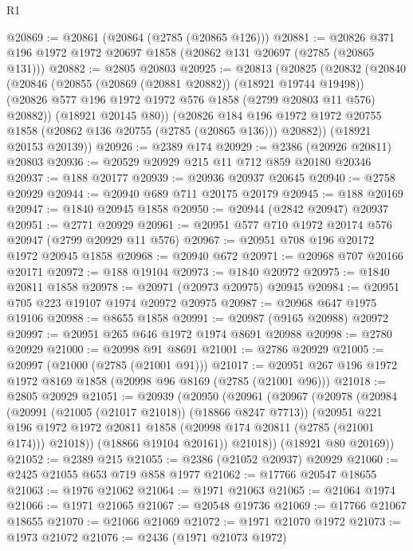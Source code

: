\begin{lexlean}{R1}
\begin{coremodule}
@20869 := @20861 (@20864 (@2785 (@20865 @126)))
@20881 := @20826 @371 @196 @1972 @1972 @20697 @1858 (@20862 @131 @20697 (@2785 (@20865 @131)))
@20882 := @2805 @20803
@20925 := @20813
    (@20825
      (@20832
        (@20840
          (@20846
            (@20855 (@20869 (@20881 @20882)) (@18921 @19744 @19498))
            (@20826 @577 @196 @1972 @1972 @576 @1858 (@2799 @20803 @11 @576) @20882))
          (@18921 @20145 @80))
        (@20826
          @184
          @196
          @1972
          @1972
          @20755
          @1858
          (@20862 @136 @20755 (@2785 (@20865 @136)))
          @20882))
      (@18921 @20153 @20139))
@20926 := @2389 @174
@20929 := @2386 (@20926 @20811) @20803
@20936 := @20529 @20929 @215 @11 @712 @859 @20180 @20346
@20937 := @188 @20177
@20939 := @20936 @20937 @20645
@20940 := @2758 @20929
@20944 := @20940 @689 @711 @20175 @20179
@20945 := @188 @20169
@20947 := @1840 @20945 @1858
@20950 := @20944 (@2842 @20947) @20937
@20951 := @2771 @20929
@20961 := @20951 @577 @710 @1972 @20174 @576 @20947 (@2799 @20929 @11 @576)
@20967 := @20951 @708 @196 @20172 @1972 @20945 @1858
@20968 := @20940 @672
@20971 := @20968 @707 @20166 @20171
@20972 := @188 @19104
@20973 := @1840 @20972
@20975 := @1840 @20811 @1858
@20978 := @20971 (@20973 @20975) @20945
@20984 := @20951 @705 @223 @19107 @1974 @20972 @20975
@20987 := @20968 @647 @1975 @19106
@20988 := @8655 @1858
@20991 := @20987 (@9165 @20988) @20972
@20997 := @20951 @265 @646 @1972 @1974 @8691 @20988
@20998 := @2780 @20929
@21000 := @20998 @91 @8691
@21001 := @2786 @20929
@21005 := @20997 (@21000 (@2785 (@21001 @91)))
@21017 := @20951 @267 @196 @1972 @1972 @8169 @1858 (@20998 @96 @8169 (@2785 (@21001 @96)))
@21018 := @2805 @20929
@21051 := @20939
    (@20950
      (@20961
        (@20967
          (@20978
            (@20984
              (@20991 (@21005 (@21017 @21018)) (@18866 @8247 @7713))
              (@20951
                @221
                @196
                @1972
                @1972
                @20811
                @1858
                (@20998 @174 @20811 (@2785 (@21001 @174)))
                @21018))
            (@18866 @19104 @20161))
          @21018))
      (@18921 @80 @20169))
@21052 := @2389 @215
@21055 := @2386 (@21052 @20937) @20929
@21060 := @2425 @21055 @653 @719 @858 @1977
@21062 := @17766 @20547 @18655
@21063 := @1976 @21062
@21064 := @1971 @21063
@21065 := @21064 @1974
@21066 := @1971 @21065
@21067 := @20548 @19736
@21069 := @17766 @21067 @18655
@21070 := @21066 @21069
@21072 := @1971 @21070 @1972
@21073 := @1973 @21072
@21076 := @2436 (@1971 @21073 @1972)

\end{coremodule}
\end{lexlean}
